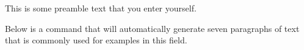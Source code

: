 \documentclass{article}
\begin{document}
This is some preamble text that you enter yourself.

Below is a command that will automatically generate seven paragraphs of text that is commonly used for examples in this field.

\lipsum[1-7]
\end{document}
